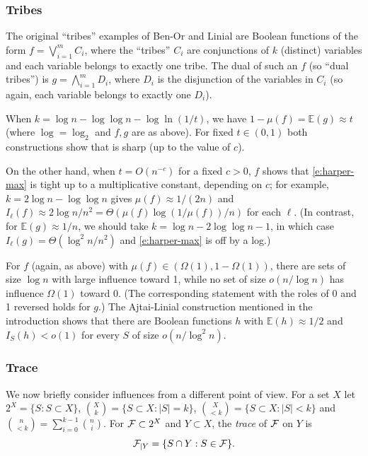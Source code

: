 \documentclass{toc}
\newcommand{\f}[0]{{\cal F}}
\newcommand{\0}[0]{\emptyset}
\newcommand{\gO}[0]{\Omega}
\begin{document}
\subsubsection *{Tribes}
The original ``tribes'' examples of Ben-Or and Linial \cite{bl}
are Boolean functions of the form
$f= \bigvee_{i=1}^m C_i$, where the   %
``tribes'' $C_i$ are %
conjunctions %
of $k$ (distinct) variables
and
each variable belongs to exactly one tribe.
The dual of such an $f$ (so ``dual tribes'') is
%
$g= \bigwedge_{i=1}^m D_i$, where  %
$D_i$ is the %
disjunction %
of the variables in $C_i$
(so again, each variable belongs to exactly one $D_i$).

When $k=\log n - \log \log n - \log \ln (1/t)$,
we have $1-\mu(f)  = \mathbb E (g) \approx t$
(where $\log = \log_2$ and $f,g$ are as above).
For fixed $t\in (0,1)$ both constructions
show that 
is sharp (up to the value of $c$).


On the other hand,
when $t=O(n^{-c})$ for a fixed
$c>0$, $f$ shows that \eqref{e:harper-max}
is tight up to a multiplicative constant, depending on $c$;
for example,
$k=2\log n-\log \log n$ gives
$\mu(f)  \approx 1/(2n)$ and
$I_\ell(f)\approx 2\log n/n^2=\Theta(\mu(f) \log(1/\mu(f) )/n)$
for each $\ell$.
(In contrast, for $\mathbb E (g)\approx 1/n$, we should
take $k= \log n-2\log \log n-1$, in which case
$I_\ell (g)=\Theta (\log^2n/n^2)$ and \eqref{e:harper-max}
is off by a log.)

For $f$ (again, as above) with $\mu(f)  \in (\gO(1),1-\gO(1))$,
there are sets of size $\log n$ with large influence
%
toward 1,  %
while no set of size $o(n/\log n)$ has
influence $\gO(1)$ %
toward 0.
(The corresponding statement with
the roles of 0 and 1 reversed holds for $g$.)
The Ajtai-Linial construction
mentioned in the introduction shows that there are Boolean functions
$h$ with $\mathbb E (h) \approx 1/2$ and $I_S(h) < o(1)$ for
every $S$ of size $o(n/\log^2n)$.



\subsubsection *{Trace}


We now briefly consider influences from a different point of view.
For a set $X$ let
$2^X = \{S: S \subset X\}$,
$\binom{X}{k}=\{S \subset X:|S|=k\}$,
$\binom{X}{< k}=\{S \subset X:|S| < k\}$ and 
$\binom{n}{<k}=\sum_{i=0}^{k-1} \binom{n}{i}.$
For $\f\subset 2^X$
and $Y \subset X$,
the \emph{trace} of $\cal F$ on $Y$ is
$${\cal F}_{|Y} = \{S \cap Y:
S \in {\cal F}\}.$$
\end{document}
